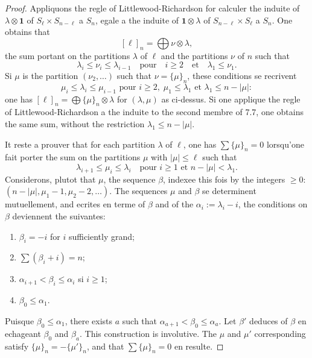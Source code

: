 \documentclass[11pt,a4paper]{article}
\theoremstyle{plain}
\theoremstyle{definition}
\begin{document}
\begin{proof}
Appliquons the regle of Littlewood-Richardson for calculer the induite of $\lambda \otimes \mathbf{1}$ of $S_\ell \times S_{n-\ell}$ a $S_n$, egale a the induite of $\mathbf{1} \otimes \lambda$ of $S_{n-\ell} \times S_\ell$ a $S_n$. One obtains that
\[
[\ell]_n = \bigoplus \nu \otimes \lambda,
\]
the sum portant on the partitions $\lambda$ of $\ell$ and the partitions $\nu$ of $n$ such that
\[
\lambda_i \leq \nu_i \leq \lambda_{i-1} \quad \text{pour} \quad i \geq 2 \quad \text{et} \quad \lambda_1 \leq \nu_1.
\]
Si $\mu$ is the partition $(\nu_2, \ldots)$ such that $\nu = \{\mu\}_n$, these conditions se recrivent
\[
\mu_i \leq \lambda_i \leq \mu_{i-1} \text{ pour } i \geq 2, \; \mu_1 \leq \lambda_1 \text{ et } \lambda_1 \leq n - |\mu|:
\]
one has $[\ell]_n = \bigoplus \{\mu\}_n \otimes \lambda$ for $(\lambda, \mu)$ as ci-dessus. Si one applique the regle of Littlewood-Richardson a the induite to the second membre of 7.7, one obtains the same sum, without the restriction $\lambda_1 \leq n - |\mu|$.

It reste a prouver that for each partition $\lambda$ of $\ell$, one has $\sum \{\mu\}_n = 0$ lorsqu'one fait porter the sum on the partitions $\mu$ with $|\mu| \leq \ell$ such that
\[
\lambda_{i+1} \leq \mu_i \leq \lambda_i \quad \text{pour } i \geq 1 \text{ et } n - |\mu| < \lambda_1.
\]
Considerons, plutot that $\mu$, the sequence $\beta$, indexee this fois by the integers $\geq 0$: $(n - |\mu|, \mu_1 - 1, \mu_2 - 2, \ldots)$. The sequences $\mu$ and $\beta$ se determinent mutuellement, and ecrites en terme of $\beta$ and of the $\alpha_i := \lambda_i - i$, the conditions on $\beta$ deviennent the suivantes:
\begin{enumerate}[label=\alph*.]
\item $\beta_i = -i$ for $i$ sufficiently grand;
\item $\sum (\beta_i + i) = n$;
\item $\alpha_{i+1} < \beta_i \leq \alpha_i$ si $i \geq 1$;
\item $\beta_0 \leq \alpha_1$.
\end{enumerate}

Puisque $\beta_0 \leq \alpha_1$, there exists $a$ such that $\alpha_{a+1} < \beta_0 \leq \alpha_a$. Let $\beta'$ deduces of $\beta$ en echageant $\beta_0$ and $\beta_a$. This construction is involutive. The $\mu$ and $\mu'$ corresponding satisfy $\{\mu\}_n = -\{\mu'\}_n$, and that $\sum \{\mu\}_n = 0$ en resulte.
\end{proof}
\end{document}
